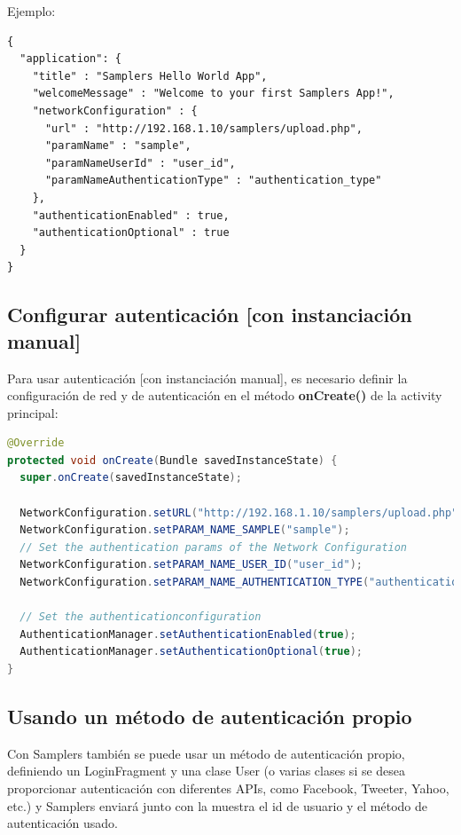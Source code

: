 Ejemplo:

\begin{lstlisting}[language=XML, frame=tlb]	
{
  "application": {
    "title" : "Samplers Hello World App",
    "welcomeMessage" : "Welcome to your first Samplers App!",
    "networkConfiguration" : {
      "url" : "http://192.168.1.10/samplers/upload.php",
      "paramName" : "sample",
      "paramNameUserId" : "user_id",
      "paramNameAuthenticationType" : "authentication_type"
    },
    "authenticationEnabled" : true,
    "authenticationOptional" : true
  } 
}
\end{lstlisting}

\subsection{Configurar autenticación [con instanciación manual]}

Para usar autenticación [con instanciación manual], es necesario definir la configuración de red y de autenticación en el método \textbf{onCreate()} de la activity principal:

\begin{lstlisting}[language=Java, frame=tlb]	
@Override
protected void onCreate(Bundle savedInstanceState) {
  super.onCreate(savedInstanceState);
	
  NetworkConfiguration.setURL("http://192.168.1.10/samplers/upload.php");
  NetworkConfiguration.setPARAM_NAME_SAMPLE("sample");
  // Set the authentication params of the Network Configuration
  NetworkConfiguration.setPARAM_NAME_USER_ID("user_id");
  NetworkConfiguration.setPARAM_NAME_AUTHENTICATION_TYPE("authentication_type");

  // Set the authenticationconfiguration
  AuthenticationManager.setAuthenticationEnabled(true);
  AuthenticationManager.setAuthenticationOptional(true);
}
\end{lstlisting}

\subsection{Usando un método de autenticación propio} \label{sec:usar_auth_propia}

Con Samplers también se puede usar un método de autenticación propio, definiendo un LoginFragment y una clase User (o varias clases si se desea proporcionar autenticación con diferentes APIs, como Facebook, Tweeter, Yahoo, etc.) y Samplers enviará junto con la muestra el id de usuario y el método de autenticación usado.



